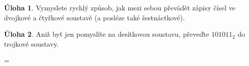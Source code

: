\documentclass[10pt,a5paper]{article}
\theoremstyle{definition}
\newtheorem{uloha}{Úloha}
\newtheorem{suloha}[uloha]{\llap{$\star$ }Úloha}
\def\vysld{}
\let\printvysl\relax
\let\printalphvysl\relax
\begin{document}
\begin{uloha}
Vymyslete rychlý způsob, jak mezi sebou převádět zápisy čísel ve dvojkové a čtyřkové soustavě (a posléze také šestnáctkové).
\end{uloha}

\begin{suloha}
Aniž byť jen pomyslíte na desítkovou soustavu, převeďte $101011_2$ do trojkové soustavy.
\end{suloha}


\newpage
\parindent=0pt
\parskip=\smallskipamount
\def\printvysl#1#2{\textbf{#1.}\ #2\par}
\def\printalphvysl#1#2#3{\textbf{#1}(#2)\ #3\par}
\vysld
\end{document}
